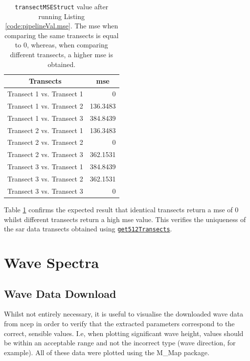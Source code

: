\begin{table}[H]
\centering
\begin{tabular}{|l|r|}
\hline
\multicolumn{1}{|c|}{\textbf{Transects}} & \multicolumn{1}{c|}{\textbf{\acs{mse}}} \\ \hline
Transect 1 vs. Transect 1 & 0 \\ \hline
Transect 1 vs. Transect 2 & 136.3483 \\ \hline
Transect 1 vs. Transect 3 & 384.8439 \\ \hline
Transect 2 vs. Transect 1 & 136.3483 \\ \hline
Transect 2 vs. Transect 2 & 0 \\ \hline
Transect 2 vs. Transect 3 & 362.1531 \\ \hline
Transect 3 vs. Transect 1 & 384.8439 \\ \hline
Transect 3 vs. Transect 2 & 362.1531 \\ \hline
Transect 3 vs. Transect 3 & 0 \\ \hline
\end{tabular}
\caption{\lstinline{transectMSEStruct} value after running Listing \ref{code:pipelineVal.mse}. The \acs{mse} when comparing the same transects is equal to 0, whereas, when comparing different transects, a higher \acs{mse} is obtained.}
\label{tab:pipelineVal.mse}
\end{table}

Table \ref{tab:pipelineVal.mse} confirms the expected result that identical transects return a \acs{mse} of 0 whilst different transects return a high \acs{mse} value. This verifies the uniqueness of the \acs{sar} data transects obtained using \href{https://github.com/JNSRYA006/sar-parameter-extraction-pipeline/blob/main/functions/preprocess/get512Transects.m}{\lstinline{get512Transects}}.

\section{Wave Spectra} \label{sec:pipelineVal.waveSpectra}

\subsection{Wave Data Download} \label{subsec:pipelineVal.waveDataDownload}

Whilst not entirely necessary, it is useful to visualise the downloaded wave data from \acs{ncep} in order to verify that the extracted parameters correspond to the correct, sensible values. I.e, when plotting significant wave height, values should be within an acceptable range and not the incorrect type (wave direction, for example). All of these data were plotted using the M\_Map package.

